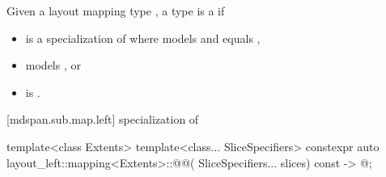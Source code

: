 \pnum
Given a layout mapping type , a type  is a
 if
\begin{itemize}
\item {} is a specialization of 
where  models 
and  equals ,
\item {} models , or
\item {} is .
\end{itemize}

[mdspan.sub.map.left]{ specialization of }

%
\begin{itemdecl}
template<class Extents>
template<class... SliceSpecifiers>
constexpr auto layout_left::mapping<Extents>::@@(
      SliceSpecifiers... slices) const -> @\seebelow@;
\end{itemdecl}


